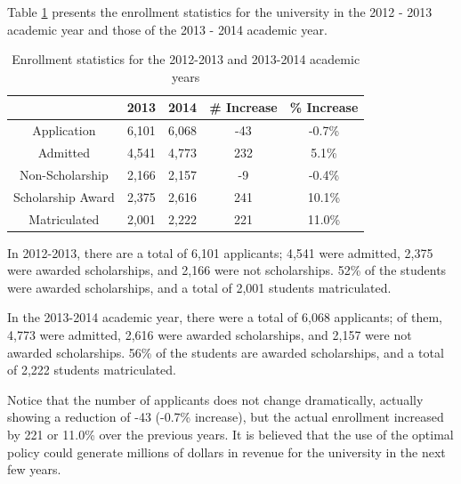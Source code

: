 \documentclass[12pt,english]{report}
\begin{document}
Table \ref{enroll_stats} presents the enrollment statistics for the university in the 2012 - 2013 academic year and those of the 2013 - 2014 academic year.

\begin{table}[H]
\centering
\begin{tabular}{|c|c|c|c|c|}
\hline
& 2013 & 2014 & \# Increase & \% Increase \\ \hline
Application                    & 6,101 & 6,068 & -43         & -0.7\%      \\\hline
Admitted                       & 4,541 & 4,773 & 232         & 5.1\%       \\\hline
Non-Scholarship                & 2,166 & 2,157 & -9          & -0.4\%      \\\hline
Scholarship Award              & 2,375 & 2,616 & 241         & 10.1\%      \\\hline
Matriculated                   & 2,001 & 2,222 & 221         & 11.0\%      \\\hline
\end{tabular}
\caption{Enrollment statistics for the 2012-2013 and 2013-2014 academic years}
\label{enroll_stats}

\end{table}

In 2012-2013, there are a total of 6,101 applicants; 4,541  were admitted, 2,375 were awarded scholarships, and 2,166 were not scholarships. 52\% of the students were awarded scholarships, and a total of 2,001 students matriculated.

In the 2013-2014 academic year, there were a total of 6,068 applicants; of them, 4,773 were admitted, 2,616 were awarded scholarships, and 2,157 were not awarded scholarships. 56\% of the students are awarded scholarships, and a total of 2,222 students matriculated.

Notice that the number of applicants does not change dramatically, actually showing a reduction of -43 (-0.7\% increase), but the actual enrollment increased by 221  or 11.0\% over the previous years.  It is believed that the use of the optimal policy could generate millions of dollars  in revenue for the university in the next few years.
\end{document}
